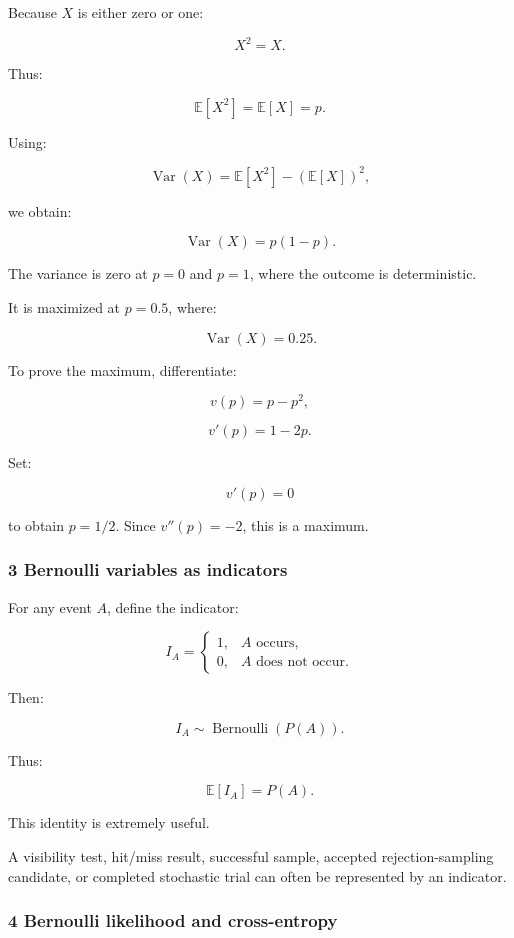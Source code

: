 Because \(X\) is either zero or one:

\[
 X^2=X.
\]

Thus:

\[
 \mathbb E[X^2]=\mathbb E[X]=p.
\]

Using:

\[
 \operatorname{Var}(X)= \mathbb E[X^2]-(\mathbb E[X])^2,
\]

we obtain:

\[
 \boxed{ \operatorname{Var}(X)=p(1-p) }.
\]

The variance is zero at \(p=0\) and \(p=1\), where the outcome is deterministic.

It is maximized at \(p=0.5\), where:

\[
 \operatorname{Var}(X)=0.25.
\]

To prove the maximum, differentiate:

\[
 v(p)=p-p^2,
\]

\[
 v'(p)=1-2p.
\]

Set:

\[
 v'(p)=0
\]

to obtain \(p=1/2\). Since \(v''(p)=-2\), this is a maximum.

\subsubsection{3 Bernoulli variables as indicators}\label{02-foundations-ii-ch023-bernoulli-variables-as-indicators}

\hypertarget{02-foundations-ii-ch023-bernoulli-variables-as-indicators}{}

For any event \(A\), define the indicator:

\[
 I_A= \begin{cases} 1,&A\text{ occurs},\\ 0,&A\text{ does not occur}. \end{cases}
\]

Then:

\[
 I_A\sim\operatorname{Bernoulli}(P(A)).
\]

Thus:

\[
 \boxed{\mathbb E[I_A]=P(A)}.
\]

This identity is extremely useful.

A visibility test, hit/miss result, successful sample, accepted rejection-sampling candidate, or completed stochastic trial can often be represented by an indicator.

\subsubsection{4 Bernoulli likelihood and cross-entropy}\label{02-foundations-ii-ch023-bernoulli-likelihood-and-cross-entropy}

